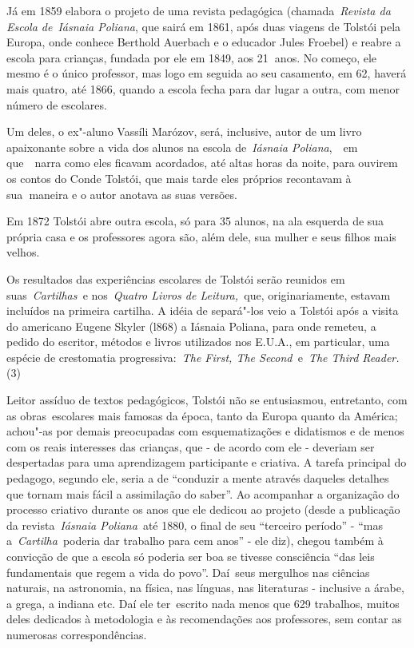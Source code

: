 Já em 1859 elabora o projeto de uma revista pedagógica
(chamada~\emph{Revista da Escola de}~\emph{Iásnaia Poliana}, que sairá
em 1861, após duas viagens de Tolstói pela Europa, onde conhece Berthold
Auerbach e o educador Jules Froebel) e reabre a escola para crianças,
fundada por ele em 1849, aos 21\textbf{~}anos. No começo, ele mesmo é o
único professor, mas logo em seguida ao seu casamento, em 62, haverá
mais quatro, até 1866, quando a escola fecha para dar lugar a outra, com
menor número de escolares.

Um deles, o ex"-aluno Vassíli Marózov, será, inclusive, autor de um livro
apaixonante sobre a vida dos alunos na escola de~\emph{Iásnaia
Poliana},~~em que~~narra como eles ficavam acordados, até altas horas da
noite, para ouvirem os contos do Conde Tolstói, que mais tarde eles
próprios recontavam à sua\textbf{~}maneira e o autor anotava as suas
versões.

Em 1872 Tolstói abre outra escola, só para 35 alunos, na ala esquerda de
sua própria casa e os professores agora são, além dele, sua mulher e
seus filhos mais velhos.

Os resultados das experiências escolares de Tolstói serão reunidos em
suas~\emph{Cartilhas~}e nos~\emph{Quatro Livros de Leitura,~}que,
originariamente, estavam incluídos na primeira cartilha. A idéia de
separá"-los veio a Tolstói após a visita do americano Eugene Skyler
(l868) a Iásnaia Poliana, para onde remeteu, a pedido do escritor,
métodos e livros utilizados nos E.U.A., em particular, uma espécie de
crestomatia progressiva:~\emph{The First, The Second~}e~\emph{The Third
Reader.}(3)

Leitor assíduo de textos pedagógicos, Tolstói não se entusiasmou,
entretanto, com as obras~escolares mais famosas da época, tanto da
Europa quanto da América; achou"-as por demais preocupadas com
esquematizações e didatismos e de menos com os reais interesses das
crianças, que - de acordo com ele - deveriam ser despertadas para uma
aprendizagem participante e criativa. A tarefa principal do pedagogo,
segundo ele, seria a de ``conduzir a mente através daqueles detalhes que
tornam mais fácil a assimilação do saber''. Ao acompanhar a organização
do processo criativo durante os anos que ele dedicou ao projeto (desde a
publicação da revista~\emph{Iásnaia Poliana}~até 1880, o final de seu
``terceiro período'' - ``mas a~\emph{Cartilha}~poderia dar trabalho para
cem anos'' - ele diz), chegou também à convicção de que a escola só
poderia ser boa se tivesse consciência ``das leis fundamentais que regem
a vida do povo''. Daí~seus mergulhos nas ciências naturais, na
astronomia, na física, nas línguas, nas literaturas - inclusive a árabe,
a grega, a indiana etc. Daí ele ter~escrito nada menos que 629
trabalhos, muitos deles dedicados à metodologia e às recomendações aos
professores, sem contar as numerosas correspondências.~~

